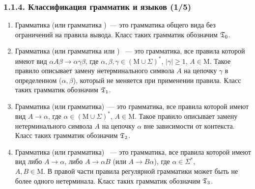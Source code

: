 \begin{frame}
\frametitle{1.1.4. Классификация грамматик и языков (1/5)}

\begin{enumerate}
\item Грамматика 
(или грамматика )~--- это грамматика общего вида без
ограничений на правила вывода. Класс таких грамматик обозначим
$\frak{T}_0$.
\item Грамматика 
(или грамматика  или
)
~--- это грамматика, все правила которой имеют вид $\alpha
A\beta\rightarrow\alpha\gamma\beta$, где $\alpha,\beta, \gamma\in (\mathrm{M}\cup
\Sigma)^*$, $|\gamma|\geq 1$, $A\in \mathrm{M}$. Такое правило описывает замену
нетерминального символа $A$ на цепочку $\gamma$ в определенном
 ($\alpha,\beta$), который не
меняется при применении правила. Класс таких грамматик обозначим
$\frak{T}_1$.
\item Грамматика 
(или
грамматика)~---  это грамматика, все правила которой имеют вид
$A\rightarrow\alpha$, где $\alpha\in (\mathrm{M}\cup \Sigma)^*$, $A\in \mathrm{M}$. Такое
правило описывает замену нетерминального символа $A$ на цепочку
$\alpha$ вне зависимости от контекста. Класс таких грамматик
обозначим $\frak{T}_2$.
\item Грамматика 
(или  грамматика) ~---
это грамматика, все правила которой имеют вид либо
$A\rightarrow\alpha$, либо $A\rightarrow\alpha B$ (или
$A\rightarrow B\alpha$), где $\alpha\in \Sigma^*$,\\ $A,B\in \mathrm{M}$.
В правой части правила регулярной грамматики может быть не более
одного нетерминала.
Класс таких грамматик обозначим
$\frak{T}_3$.
\end{enumerate}
\end{frame}

